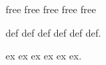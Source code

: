 \chapter{}

free free free
free free

\begin{group}
\begin{definition}
  def def def
  def
  def def.
\end{definition}


\begin{example}
  ex ex ex
  ex
  ex ex.
\end{example}

\end{group}
